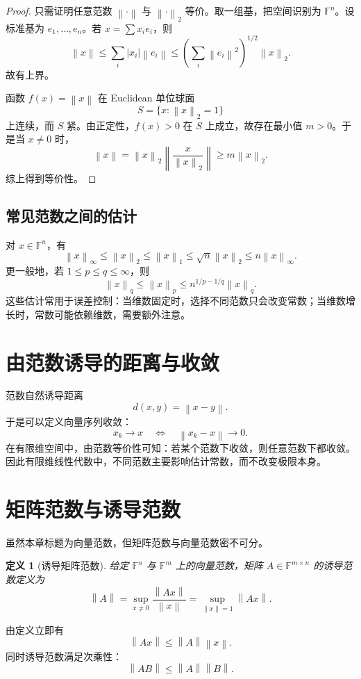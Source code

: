 \documentclass[UTF8,openany,zihao=-4]{ctexbook}
\theoremstyle{cnplain}
\newtheorem{definition}{定义}[chapter]
\newcommand{\F}{\mathbb F}
\newcommand{\norm}[1]{\left\lVert #1\right\rVert}
\newcommand{\abs}[1]{\left\lvert #1\right\rvert}
\begin{document}
\begin{proof}
只需证明任意范数 $\norm{\cdot}$ 与 $\norm{\cdot}_2$ 等价。取一组基，把空间识别为 $\F^n$。设标准基为 $e_1,
\ldots,e_n$。若 $x=\sum x_ie_i$，则
\[
\norm{x}\le\sum_i\abs{x_i}\norm{e_i}
\le\left(\sum_i\norm{e_i}^2\right)^{1/2}\norm{x}_2.
\]
故有上界。

函数 $f(x)=\norm{x}$ 在 Euclidean 单位球面
\[
S=\{x:\norm{x}_2=1\}
\]
上连续，而 $S$ 紧。由正定性，$f(x)>0$ 在 $S$ 上成立，故存在最小值 $m>0$。于是当 $x\ne0$ 时，
\[
\norm{x}=\norm{x}_2\norm{\frac{x}{\norm{x}_2}}
\ge m\norm{x}_2.
\]
综上得到等价性。
\end{proof}

\subsection{常见范数之间的估计}

对 $x\in\F^n$，有
\[
\norm{x}_\infty\le\norm{x}_2\le\norm{x}_1\le\sqrt n\norm{x}_2\le n\norm{x}_\infty.
\]
更一般地，若 $1\le p\le q\le\infty$，则
\[
\norm{x}_q\le\norm{x}_p\le n^{1/p-1/q}\norm{x}_q.
\]
这些估计常用于误差控制：当维数固定时，选择不同范数只会改变常数；当维数增长时，常数可能依赖维数，需要额外注意。

\section{由范数诱导的距离与收敛}

范数自然诱导距离
\[
d(x,y)=\norm{x-y}.
\]
于是可以定义向量序列收敛：
\[
x_k\to x
\quad\Longleftrightarrow\quad
\norm{x_k-x}\to0.
\]
在有限维空间中，由范数等价性可知：若某个范数下收敛，则任意范数下都收敛。因此有限维线性代数中，不同范数主要影响估计常数，而不改变极限本身。

\section{矩阵范数与诱导范数}

虽然本章标题为向量范数，但矩阵范数与向量范数密不可分。

\begin{definition}[诱导矩阵范数]
给定 $\F^n$ 与 $\F^m$ 上的向量范数，矩阵 $A\in\F^{m\times n}$ 的诱导范数定义为
\[
\norm{A}=\sup_{x\ne0}\frac{\norm{Ax}}{\norm{x}}
=\sup_{\norm{x}=1}\norm{Ax}.
\]
\end{definition}

由定义立即有
\[
\norm{Ax}\le\norm{A}\norm{x}.
\]
同时诱导范数满足次乘性：
\[
\norm{AB}\le\norm{A}\norm{B}.
\]
\end{document}
